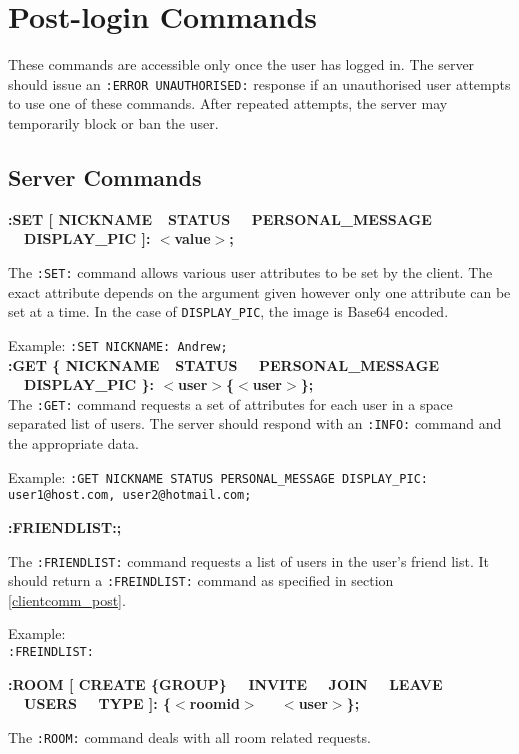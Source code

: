 \section{Post-login Commands}

These commands are accessible only once the user has logged in. The server should issue an \texttt{:ERROR UNAUTHORISED:} response if an unauthorised user attempts to use one of these commands. After repeated attempts, the server may temporarily block or ban the user.

\subsection{Server Commands}

{\bf :SET [ NICKNAME\ \vline \ STATUS \ \vline \ PERSONAL\_MESSAGE \ \vline \ DISPLAY\_PIC ]: $<$value$>$;}

The \texttt{:SET:} command allows various user attributes to be set by the client. The exact attribute depends on the argument given however only one attribute can be set at a time. In the case of \texttt{DISPLAY\_PIC}, the image is Base64 encoded.

Example:
\texttt{:SET NICKNAME: Andrew;} \\

{\bf :GET \{ NICKNAME\ \vline \ STATUS \ \vline \ PERSONAL\_MESSAGE \ \vline \ DISPLAY\_PIC \}: $<$user$>$\{$<$user$>$\};} \\

The \texttt{:GET:} command requests a set of attributes for each user in a space separated list of users. The server should respond with an \texttt{:INFO:} command and the appropriate data.

Example:
\texttt{:GET NICKNAME STATUS PERSONAL\_MESSAGE DISPLAY\_PIC: user1@host.com, user2@hotmail.com;}

{\bf :FRIENDLIST:;}

The \texttt{:FRIENDLIST:} command requests a list of users in the user's friend list. It should return a \texttt{:FREINDLIST:} command as specified in section \ref{clientcomm_post}.

Example: \\
\texttt{:FREINDLIST:} 
	
{\bf :ROOM [ CREATE \{GROUP\} \ \vline \ INVITE \ \vline \ JOIN \ \vline \ LEAVE \ \vline \ USERS \ \vline \ TYPE ]: \{$<$roomid$>$ \ \vline \ $<$user$>$\};}

The \texttt{:ROOM:} command deals with all room related requests.

